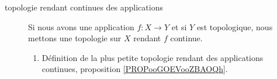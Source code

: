 \begin{description}
\begin{enumerate}
    \end{enumerate}
\item[topologie rendant continues des applications]
    Si nous avons une application \( f\colon X\to Y\) et si \( Y\) est topologique, nous mettons une topologie sur \( X\) rendant \( f\) continue.
    \begin{enumerate}
        \item
            Définition de la plus petite topologie rendant des applications continues, proposition \ref{PROPooGOEVooZBAOQh}.
    \end{enumerate}
\end{description}

